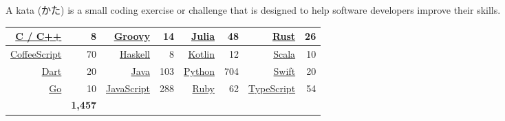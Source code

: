 \documentclass[10pt]{res} %
\begin{document}
\begin{resume}
\vspace{0.025in}

\colorbox{darkblue}{}

\begin{CJK}{UTF8}{ipxm}
A kata (かた) is a small coding exercise or challenge that is designed to help software developers improve their skills.
\end{CJK}

\begin{table}[htb]
\centering
\label{tab:my-table}
\begin{tabular}{rrrrrrrr}
\href{https://bitbucket.org/bjpeterdelacruz/c-katas/src/master/}{\color{blue}C / C++}                            &  8 & \href{https://bitbucket.org/bjpeterdelacruz/groovy-katas/src/master/}{\color{blue}Groovy}                                 &  14 & \href{https://bitbucket.org/bjpeterdelacruz/julia-katas/src/master/}{\color{blue}Julia}   &  48 & \href{https://bitbucket.org/bjpeterdelacruz/rust-katas/src/master/}{\color{blue}Rust}           &         26  \\ \hline
\href{https://bitbucket.org/bjpeterdelacruz/javascript-coffeescript-katas/src/master/}{\color{blue}CoffeeScript} & 70 & \href{https://bitbucket.org/bjpeterdelacruz/haskell-katas/src/master/}{\color{blue}Haskell}                               &   8 & \href{https://bitbucket.org/bjpeterdelacruz/kotlin-katas/src/master/}{\color{blue}Kotlin} &  12 & \href{https://bitbucket.org/bjpeterdelacruz/scala-katas/src/master/}{\color{blue}Scala}         &         10  \\ \hline
\href{https://bitbucket.org/bjpeterdelacruz/dart-katas/src/master/}{\color{blue}Dart}                            & 20 & \href{https://bitbucket.org/bjpeterdelacruz/java-katas/src/master/}{\color{blue}Java}                                     & 103 & \href{https://bitbucket.org/bjpeterdelacruz/python-katas/src/master/}{\color{blue}Python} & 704 & \href{https://bitbucket.org/bjpeterdelacruz/swift-katas/src/master/}{\color{blue}Swift}         &         20  \\ \hline
\href{https://bitbucket.org/bjpeterdelacruz/go-katas/src/master/}{\color{blue}Go}                                & 10 & \href{https://bitbucket.org/bjpeterdelacruz/javascript-coffeescript-katas/src/master/}{\color{blue}JavaScript}            & 288 & \href{https://bitbucket.org/bjpeterdelacruz/ruby-katas/src/master/}{\color{blue}Ruby}     &  62 & \href{https://bitbucket.org/bjpeterdelacruz/typescript-katas/src/main/}{\color{blue}TypeScript} &         54  \\ \hline \rowcolor{LightBlue}
\multicolumn{7}{r}{\bf Total}                                                                                                                                                                                                                                                                                                                                                                                                                               & {\bf 1,457} \\ \hline
\end{tabular}
\end{table}


\end{resume}
\end{document}
